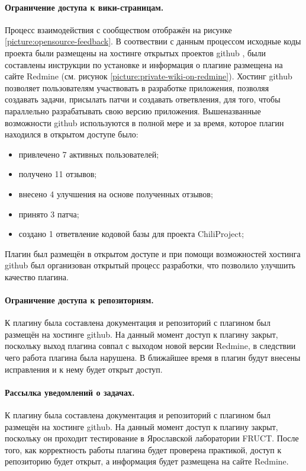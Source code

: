\paragraph{Ограничение доступа к вики-страницам.}
Процесс взаимодействия с сообществом отображён на рисунке
\ref{picture:opensource-feedback}. В соотвествии с данным процессом исходные
коды проекта были размещены на хостинге открытых проектов github \cite{github},
были составлены инструкции по установке и информация о плагине размещена
\cite{private-wiki} на сайте Redmine (см. рисунок
\ref{picture:private-wiki-on-redmine}). Хостинг github позволяет пользователям
участвовать в разработке приложения, позволяя создавать задачи, присылать патчи
и создавать ответвления, для того, чтобы параллельно разрабатывать свою версию
приложения. Вышеназванные возможности github используются в полной мере и за
время, которое плагин находился в открытом доступе было:
\begin{itemize}
  \item привлечено 7 активных пользователей;
  \item получено 11 отзывов;
  \item внесено 4 улучшения на основе полученных отзывов; 
  \item принято 3 патча;
  \item создано 1 ответвление кодовой базы для проекта ChiliProject;
\end{itemize}
Плагин был размещён в открытом доступе и при помощи возможностей хостинга
github был организован открытый процесс разработки, что позволило улучшить
качество плагина.

\paragraph{Ограничение доступа к репозиториям.}
К плагину была составлена документация и репозиторий с плагином был размещён на
хостинге github. На данный момент доступ к плагину закрыт, поскольку выход
плагина совпал с выходом новой версии Redmine, в следствии чего работа плагина
была нарушена. В ближайшее время в плагин будут внесены исправления и к нему
будет открыт доступ.

\paragraph{Рассылка уведомлений о задачах.}
К плагину была составлена документация и репозиторий с плагином был размещён на
хостинге github. На данный момент доступ к плагину закрыт, поскольку он
проходит тестирование в Ярославской лаборатории FRUCT. После того, как
корректность работы плагина будет проверена практикой, доступ к репозиторию
будет открыт, а информация будет размещена на сайте Redmine.

